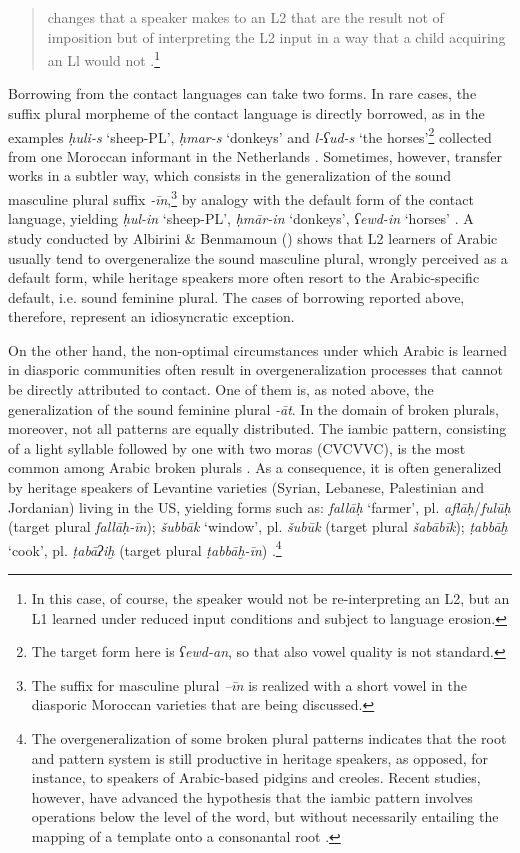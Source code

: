 \documentclass[output=paper]{langsci/langscibook}
\begin{document}
\begin{quote}changes that a speaker makes to an L2 that are the result not of imposition but of interpreting the L2 input in a way that a child acquiring an Ll would not \citep[525]{Lucas2015}.\footnote{In this case, of course, the speaker would not be re-interpreting an L2, but an L1 learned under reduced input conditions and subject to language erosion.}\end{quote}

Borrowing from the contact languages can take two forms. In rare cases, the suffix plural morpheme of the contact language is directly borrowed, as in the examples \textit{ḥuli-s} ‘sheep-PL’, \textit{ḥmar-s} ‘donkeys’ and \textit{l-ʕud-s} ‘the horses’\footnote{The target form here is \textit{ʕewd-an}, so that also vowel quality is not standard.} collected from one Moroccan informant in the Netherlands \citep[274]{BoumansdeRuiter2002}. Sometimes, however, transfer works in a subtler way, which consists in the generalization of the sound masculine plural suffix \textit{{}-īn},\footnote{The suffix for masculine plural \textit{–īn} is realized with a short vowel in the diasporic Moroccan varieties that are being discussed.} by analogy with the default form of the contact language, yielding \textit{ḥul-in} ‘sheep-PL’, \textit{ḥmār-in} ‘donkeys’, \textit{ʕewd-in} ‘horses’ \citep[274]{BoumansdeRuiter2002}. A study conducted by Albirini \& Benmamoun (\citeyear[866–867]{AlbiriniBenmamoun2014}) shows that L2 learners of Arabic usually tend to overgeneralize the sound masculine plural, wrongly perceived as a default form, while heritage speakers more often resort to the Arabic-specific default, i.e. sound feminine plural. The cases of borrowing reported above, therefore, represent an idiosyncratic exception.

On the other hand, the non-optimal circumstances under which Arabic is learned in diasporic communities often result in overgeneralization processes that cannot be directly attributed to contact. One of them is, as noted above, the generalization of the sound feminine plural \textit{{}-āt}. In the domain of broken plurals, moreover, not all patterns are equally distributed. The iambic pattern, consisting of a light syllable followed by one with two moras (CVCVVC), is the most common among Arabic broken plurals \citep[857]{AlbiriniBenmamoun2014}. As a consequence, it is often generalized by heritage speakers of Levantine varieties (Syrian, Lebanese, Palestinian and Jordanian) living in the US, yielding forms such as: \textit{fallāḥ} ‘farmer’, pl. \textit{aflāḥ}/\textit{fulūḥ} (target plural \textit{fallāḥ-īn}); \textit{šubbāk} ‘window’, pl. \textit{šubūk} (target plural \textit{šabābīk}); \textit{ṭabbāḫ} ‘cook’, pl. \textit{ṭabāʔiḫ} (target plural \textit{ṭabbāḫ-īn}) \citep[865]{AlbiriniBenmamoun2014}.\footnote{The overgeneralization of some broken plural patterns indicates that the root and pattern system is still productive in heritage speakers, as opposed, for instance, to speakers of Arabic-based pidgins and creoles. Recent studies, however, have advanced the hypothesis that the iambic pattern involves operations below the level of the word, but without necessarily entailing the mapping of a template onto a consonantal root \citep[112]{AlbiriniSaadah2014}.} 
\end{document}
